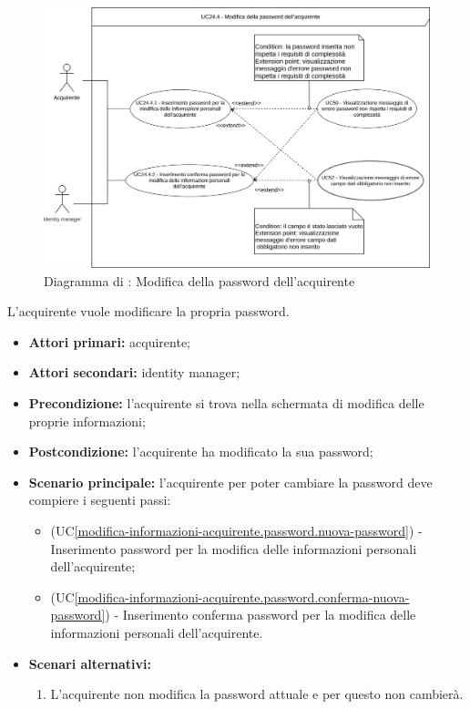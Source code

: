 \label{modifica-informazioni-acquirente.password}

\begin{figure}[H]
    \centering
    \includegraphics[scale=0.6]{Immagini/DiagrammiUC/Acquirente/ModificaPasswordAcquirente.png}
    \caption{Diagramma di \actualSubUC: Modifica della password dell'acquirente}
    \label{fig:modifica-informazioni-acquirente.password}
\end{figure}

L'acquirente vuole modificare la propria password.
\begin{itemize}
    \item \textbf{Attori primari:} acquirente;
    \item \textbf{Attori secondari:} identity manager;
    \item \textbf{Precondizione:} l'acquirente si trova nella schermata di modifica delle proprie informazioni;
    \item \textbf{Postcondizione:} l'acquirente ha modificato la sua password;
    \item \textbf{Scenario principale:} l'acquirente per poter cambiare la password deve compiere i seguenti passi:
    \begin{itemize}
        \item (UC\ref{modifica-informazioni-acquirente.password.nuova-password}) - Inserimento password per la modifica delle informazioni personali dell'acquirente;
        \item (UC\ref{modifica-informazioni-acquirente.password.conferma-nuova-password}) - Inserimento conferma password per la modifica delle informazioni personali dell'acquirente.
    \end{itemize}
    \item \textbf{Scenari alternativi:}
    \begin{enumerate}[label=\lett]
        \item L'acquirente non modifica la password attuale e per questo non cambierà. 
    \end{enumerate}
\end{itemize}

